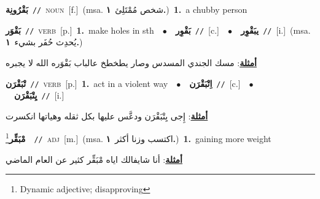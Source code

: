 \documentclass[10pt,a4paper,twoside]{article} %
\begin{document}
\begin{multicols}{2}
{\setlength\topsep{0pt}\textbf{\foreignlanguage{arabic}{بَقْرُونِة}}\ {\color{gray}\texttt{//}\color{black}}\ \textsc{noun}\ [f.]\ \color{gray}(msa. \foreignlanguage{arabic}{شخص مُمْتَلِئ}~\foreignlanguage{arabic}{\textbf{١.}})\color{black}\ \textbf{1.}~a chubby person\ } \vspace{2mm}

{\setlength\topsep{0pt}\textbf{\foreignlanguage{arabic}{بَقْوَر}}\ {\color{gray}\texttt{//}\color{black}}\ \textsc{verb}\ [p.]\ \textbf{1.}~make holes in sth\ \ $\bullet$\ \ \setlength\topsep{0pt}\textbf{\foreignlanguage{arabic}{بَقْوِر}}\ {\color{gray}\texttt{//}\color{black}}\ [c.]\ \ $\bullet$\ \ \setlength\topsep{0pt}\textbf{\foreignlanguage{arabic}{يبَقْوِر}}\ {\color{gray}\texttt{//}\color{black}}\ [i.]\ \color{gray}(msa. \foreignlanguage{arabic}{يُحدِث حُفَر بشيء}~\foreignlanguage{arabic}{\textbf{١.}})\color{black}\  \begin{flushright}\color{gray}\foreignlanguage{arabic}{\textbf{\underline{\foreignlanguage{arabic}{أمثلة}}}: مسك الجندي المسدس وصار يطخطخ عالباب بَقْوَره الله لا يجبره}\end{flushright}\color{black}} \vspace{2mm}

{\setlength\topsep{0pt}\textbf{\foreignlanguage{arabic}{تْبَقْرَن}}\ {\color{gray}\texttt{//}\color{black}}\ \textsc{verb}\ [p.]\ \textbf{1.}~act in a violent way\ \ $\bullet$\ \ \setlength\topsep{0pt}\textbf{\foreignlanguage{arabic}{اِتْبَقْرَن}}\ {\color{gray}\texttt{//}\color{black}}\ [c.]\ \ $\bullet$\ \ \setlength\topsep{0pt}\textbf{\foreignlanguage{arabic}{يِتْبَقْرَن}}\ {\color{gray}\texttt{//}\color{black}}\ [i.]\  \begin{flushright}\color{gray}\foreignlanguage{arabic}{\textbf{\underline{\foreignlanguage{arabic}{أمثلة}}}: إِجى يِتْبَقْرَن ودعَّس عليها بكل ثقله وهياتها انكسرت}\end{flushright}\color{black}} \vspace{2mm}

{\setlength\topsep{0pt}\textbf{\foreignlanguage{arabic}{مْبَقِّر}}\footnote{Dynamic adjective; disapproving}\ \ {\color{gray}\texttt{//}\color{black}}\ \textsc{adj}\ [m.]\ \color{gray}(msa. \foreignlanguage{arabic}{اكتسب وزنا أكثر}~\foreignlanguage{arabic}{\textbf{١.}})\color{black}\ \textbf{1.}~gaining more weight\  \begin{flushright}\color{gray}\foreignlanguage{arabic}{\textbf{\underline{\foreignlanguage{arabic}{أمثلة}}}: أنا شايفالك اياه مْبَقِّر كثير عن العام الماضي}\end{flushright}\color{black}} \vspace{2mm}


\end{multicols}
\end{document}
